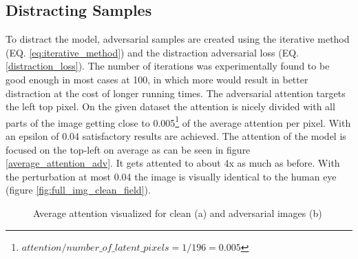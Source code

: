 \subsection*{Distracting Samples}
To distract the model, adversarial samples are created using the iterative method (EQ. \ref{eq:iterative_method}) and the distraction adversarial loss (EQ. \ref{distraction_loss}). The number of iterations was experimentally found to be good enough in most cases at 100, in which more would result in better distraction at the cost of longer running times. The adversarial attention targets the left top pixel. On the given dataset the attention is nicely divided with all parts of the image getting close to 0.005\footnote[1]{$attention / number\_of\_latent\_pixels = 1 / 196 = 0.005$} of the average attention per pixel. With an epsilon of 0.04 satisfactory results are achieved. The attention of the model is focused on the top-left on average as can be seen in figure \ref{average_attention_adv}. It gets attented to about 4x as much as before. With the perturbation at most 0.04 the image is visually identical to the human eye (figure \ref{fig:full_img_clean_field}).

\begin{figure}[H]
    \centering
    \vspace{\floatsep}
    \caption{Average attention visualized for clean (a) and adversarial images (b)}
    \label{average_attention}
\end{figure}


